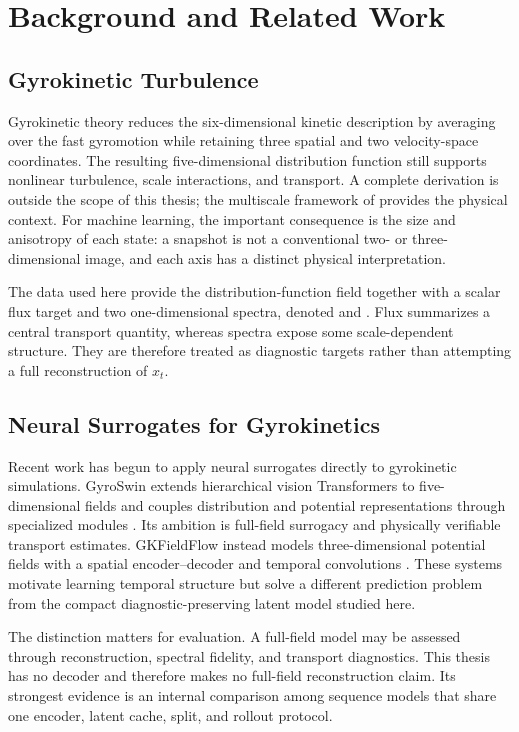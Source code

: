 \cleardoubleoddpage
\chapter{Background and Related Work}
\label{chap:background}

\section{Gyrokinetic Turbulence}

Gyrokinetic theory reduces the six-dimensional kinetic description by averaging over the fast
gyromotion while retaining three spatial and two velocity-space coordinates. The resulting
five-dimensional distribution function still supports nonlinear turbulence, scale interactions,
and transport. A complete derivation is outside the scope of this thesis; the multiscale framework
of \citet{abel2013multiscale} provides the physical context. For machine learning, the important
consequence is the size and anisotropy of each state: a snapshot is not a conventional two- or
three-dimensional image, and each axis has a distinct physical interpretation.

The data used here provide the distribution-function field together with a scalar flux target and
two one-dimensional spectra, denoted  and . Flux summarizes a central
transport quantity, whereas spectra expose some scale-dependent structure. They are therefore
treated as diagnostic targets rather than attempting a full reconstruction of $x_t$.

\section{Neural Surrogates for Gyrokinetics}

Recent work has begun to apply neural surrogates directly to gyrokinetic simulations. GyroSwin
extends hierarchical vision Transformers to five-dimensional fields and couples distribution and
potential representations through specialized modules \citep{paischer2025gyroswin}. Its ambition
is full-field surrogacy and physically verifiable transport estimates. GKFieldFlow instead models
three-dimensional potential fields with a spatial encoder--decoder and temporal convolutions
\citep{ashourvan2026gkfieldflow}. These systems motivate learning temporal structure but solve a
different prediction problem from the compact diagnostic-preserving latent model studied here.

The distinction matters for evaluation. A full-field model may be assessed through reconstruction,
spectral fidelity, and transport diagnostics. This thesis has no decoder and therefore makes no
full-field reconstruction claim. Its strongest evidence is an internal comparison among sequence
models that share one encoder, latent cache, split, and rollout protocol.

